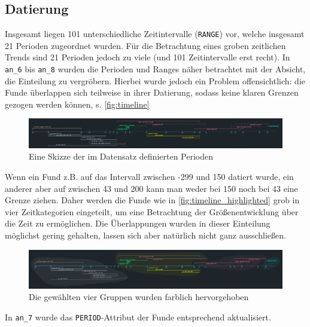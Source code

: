 \subsection{Datierung}

Insgesamt liegen 101 unterschiedliche Zeitintervalle (\texttt{RANGE}) vor, welche insgesamt 21 Perioden zugeordnet wurden. 
Für die Betrachtung eines groben zeitlichen Trends sind 21 Perioden jedoch zu viele (und 101 Zeitintervalle erst recht). 
In \texttt{an\_6} bis \texttt{an\_8} wurden die Perioden und Ranges näher betrachtet mit der Absicht, die Einteilung zu vergröbern. 
Hierbei wurde jedoch ein Problem offensichtlich: die Funde überlappen sich teilweise in ihrer Datierung, sodass keine klaren Grenzen gezogen werden können, s. \autoref{fig:timeline}

\begin{figure}[H]
    \centering
    \includegraphics[width=\textwidth]{docs/attachments/ab-project_timeline.png}
    \caption{Eine Skizze der im Datensatz definierten Perioden}
    \label{fig:timeline}
\end{figure}

Wenn ein Fund z.B. auf das Intervall zwischen -299 und 150 datiert wurde, ein anderer aber auf zwischen 43 und 200 kann man weder bei 150 noch bei 43 eine Grenze ziehen.
Daher werden die Funde wie in \autoref{fig:timeline_highlighted} grob in vier Zeitkategorien eingeteilt, um eine Betrachtung der Größenentwicklung über die Zeit zu ermöglichen. 
Die Überlappungen wurden in dieser Einteilung möglichst gering gehalten, lassen sich aber natürlich nicht ganz ausschließen.

\begin{figure}[H]
    \centering
    \includegraphics[width=\textwidth]{docs/attachments/ab-project_timeline-highlighted.png}
    \caption{Die gewählten vier Gruppen wurden farblich hervorgehoben}
    \label{fig:timeline_highlighted}
\end{figure}

In \texttt{an\_7} wurde das \texttt{PERIOD}-Attribut der Funde entsprechend aktualisiert.